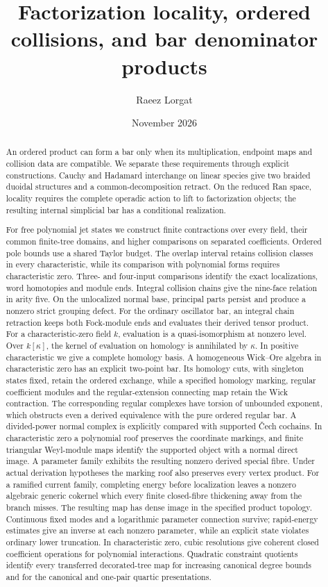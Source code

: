 \documentclass[11pt,reqno]{amsart}
\title[Locality, collisions, and bar denominators]
{Factorization locality, ordered collisions, and bar denominator products}
\author{Raeez Lorgat}
\date{November 2026}
\theoremstyle{definition}
\theoremstyle{remark}
\begin{document}

\begin{abstract}
An ordered product can form a bar only when its multiplication,
endpoint maps and collision data are compatible.  We separate these
requirements through explicit constructions.  Cauchy and Hadamard
interchange on linear species give two braided duoidal structures and
a common-decomposition retract.  On the reduced Ran space, locality
requires the complete operadic action to lift to factorization objects;
the resulting internal simplicial bar has a conditional realization.

For free polynomial jet states we construct finite contractions over
every field, their common finite-tree domains, and higher comparisons
on separated coefficients.  Ordered pole bounds use a shared Taylor
budget.  The overlap interval retains collision classes in every
characteristic, while its comparison with polynomial forms requires
characteristic zero.  Three- and four-input comparisons identify the
exact localizations, word homotopies and module ends.  Integral
collision chains give the nine-face relation in arity five.  On the
unlocalized normal base, principal parts persist and produce a
nonzero strict grouping defect.
For the ordinary oscillator bar, an integral chain retraction keeps
both Fock-module ends and evaluates their derived tensor product.
For a characteristic-zero field \(k\), evaluation is a quasi-isomorphism
at nonzero level.  Over \(k[\kappa]\), the kernel of evaluation on
homology is annihilated by \(\kappa\).  In positive characteristic
we give a complete homology basis.
A homogeneous Wick--Ore algebra in characteristic zero has an explicit
two-point bar.  Its homology cuts, with singleton states fixed, retain
the ordered exchange, while a specified homology marking, regular
coefficient modules and the regular-extension connecting map retain
the Wick contraction.
The corresponding regular complexes have torsion of unbounded exponent,
which obstructs even a derived equivalence with the pure ordered regular bar.
A divided-power normal complex is explicitly compared with supported
\v{C}ech cochains.  In characteristic zero a polynomial roof preserves
the coordinate markings, and finite triangular Weyl-module maps identify
the supported object with a normal direct image.  A parameter family
exhibits the resulting nonzero derived special fibre.  Under actual
derivation hypotheses the marking roof also preserves every vertex product.
For a ramified current family, completing energy before localization
leaves a nonzero algebraic generic cokernel which every finite
closed-fibre thickening away from the branch misses.  The resulting
map has dense image in the specified product topology.  Continuous fixed modes
and a logarithmic parameter connection survive; rapid-energy
estimates give an inverse at each nonzero parameter, while an
explicit state violates ordinary lower truncation.
In characteristic zero, cubic resolutions give coherent closed
coefficient operations for polynomial interactions.  Quadratic
constraint quotients identify every transferred decorated-tree map
for increasing canonical degree bounds and for the canonical and
one-pair quartic presentations.


\end{abstract}
\end{document}
